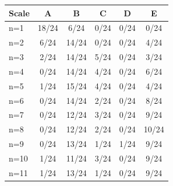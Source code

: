 \begin{tabular}{lccccc}
\toprule
Scale & \cellcolor[HTML]{FFFFFF} A & \cellcolor[HTML]{EA4646} B & \cellcolor[HTML]{9670BD} C & \cellcolor[HTML]{8FEB32} D & \cellcolor[HTML]{19C8C8} E \\
\midrule
n=1 & \cellcolor[HTML]{FFFFFF} 18/24 & \cellcolor[HTML]{EA4646} 6/24 & \cellcolor[HTML]{9670BD} 0/24 & \cellcolor[HTML]{8FEB32} 0/24 & \cellcolor[HTML]{19C8C8} 0/24 \\
n=2 & \cellcolor[HTML]{FFFFFF} 6/24 & \cellcolor[HTML]{EA4646} 14/24 & \cellcolor[HTML]{9670BD} 0/24 & \cellcolor[HTML]{8FEB32} 0/24 & \cellcolor[HTML]{19C8C8} 4/24 \\
n=3 & \cellcolor[HTML]{FFFFFF} 2/24 & \cellcolor[HTML]{EA4646} 14/24 & \cellcolor[HTML]{9670BD} 5/24 & \cellcolor[HTML]{8FEB32} 0/24 & \cellcolor[HTML]{19C8C8} 3/24 \\
n=4 & \cellcolor[HTML]{FFFFFF} 0/24 & \cellcolor[HTML]{EA4646} 14/24 & \cellcolor[HTML]{9670BD} 4/24 & \cellcolor[HTML]{8FEB32} 0/24 & \cellcolor[HTML]{19C8C8} 6/24 \\
n=5 & \cellcolor[HTML]{FFFFFF} 1/24 & \cellcolor[HTML]{EA4646} 15/24 & \cellcolor[HTML]{9670BD} 4/24 & \cellcolor[HTML]{8FEB32} 0/24 & \cellcolor[HTML]{19C8C8} 4/24 \\
n=6 & \cellcolor[HTML]{FFFFFF} 0/24 & \cellcolor[HTML]{EA4646} 14/24 & \cellcolor[HTML]{9670BD} 2/24 & \cellcolor[HTML]{8FEB32} 0/24 & \cellcolor[HTML]{19C8C8} 8/24 \\
n=7 & \cellcolor[HTML]{FFFFFF} 0/24 & \cellcolor[HTML]{EA4646} 12/24 & \cellcolor[HTML]{9670BD} 3/24 & \cellcolor[HTML]{8FEB32} 0/24 & \cellcolor[HTML]{19C8C8} 9/24 \\
n=8 & \cellcolor[HTML]{FFFFFF} 0/24 & \cellcolor[HTML]{EA4646} 12/24 & \cellcolor[HTML]{9670BD} 2/24 & \cellcolor[HTML]{8FEB32} 0/24 & \cellcolor[HTML]{19C8C8} 10/24 \\
n=9 & \cellcolor[HTML]{FFFFFF} 0/24 & \cellcolor[HTML]{EA4646} 13/24 & \cellcolor[HTML]{9670BD} 1/24 & \cellcolor[HTML]{8FEB32} 1/24 & \cellcolor[HTML]{19C8C8} 9/24 \\
n=10 & \cellcolor[HTML]{FFFFFF} 1/24 & \cellcolor[HTML]{EA4646} 11/24 & \cellcolor[HTML]{9670BD} 3/24 & \cellcolor[HTML]{8FEB32} 0/24 & \cellcolor[HTML]{19C8C8} 9/24 \\
n=11 & \cellcolor[HTML]{FFFFFF} 1/24 & \cellcolor[HTML]{EA4646} 13/24 & \cellcolor[HTML]{9670BD} 1/24 & \cellcolor[HTML]{8FEB32} 0/24 & \cellcolor[HTML]{19C8C8} 9/24 \\

\end{tabular}
